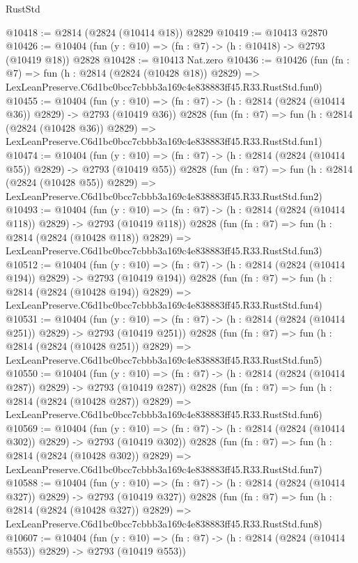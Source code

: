 \begin{lexlean}{RustStd}
\begin{coremodule}
@10418 := @2814 (@2824 (@10414 @18)) @2829
@10419 := @10413 @2870
@10426 := @10404 (fun (y : @10) => (fn : @7) -> (h : @10418) -> @2793 (@10419 @18)) @2828
@10428 := @10413 Nat.zero
@10436 := @10426
    (fun (fn : @7) =>
    fun (h : @2814 (@2824 (@10428 @18)) @2829) =>
    LexLeanPreserve.C6d1bc0bcc7cbbb3a169c4e838883ff45.R33.RustStd.fun0)
@10455 := @10404
    (fun (y : @10) => (fn : @7) -> (h : @2814 (@2824 (@10414 @36)) @2829) -> @2793 (@10419 @36))
    @2828
    (fun (fn : @7) =>
    fun (h : @2814 (@2824 (@10428 @36)) @2829) =>
    LexLeanPreserve.C6d1bc0bcc7cbbb3a169c4e838883ff45.R33.RustStd.fun1)
@10474 := @10404
    (fun (y : @10) => (fn : @7) -> (h : @2814 (@2824 (@10414 @55)) @2829) -> @2793 (@10419 @55))
    @2828
    (fun (fn : @7) =>
    fun (h : @2814 (@2824 (@10428 @55)) @2829) =>
    LexLeanPreserve.C6d1bc0bcc7cbbb3a169c4e838883ff45.R33.RustStd.fun2)
@10493 := @10404
    (fun (y : @10) => (fn : @7) -> (h : @2814 (@2824 (@10414 @118)) @2829) -> @2793 (@10419 @118))
    @2828
    (fun (fn : @7) =>
    fun (h : @2814 (@2824 (@10428 @118)) @2829) =>
    LexLeanPreserve.C6d1bc0bcc7cbbb3a169c4e838883ff45.R33.RustStd.fun3)
@10512 := @10404
    (fun (y : @10) => (fn : @7) -> (h : @2814 (@2824 (@10414 @194)) @2829) -> @2793 (@10419 @194))
    @2828
    (fun (fn : @7) =>
    fun (h : @2814 (@2824 (@10428 @194)) @2829) =>
    LexLeanPreserve.C6d1bc0bcc7cbbb3a169c4e838883ff45.R33.RustStd.fun4)
@10531 := @10404
    (fun (y : @10) => (fn : @7) -> (h : @2814 (@2824 (@10414 @251)) @2829) -> @2793 (@10419 @251))
    @2828
    (fun (fn : @7) =>
    fun (h : @2814 (@2824 (@10428 @251)) @2829) =>
    LexLeanPreserve.C6d1bc0bcc7cbbb3a169c4e838883ff45.R33.RustStd.fun5)
@10550 := @10404
    (fun (y : @10) => (fn : @7) -> (h : @2814 (@2824 (@10414 @287)) @2829) -> @2793 (@10419 @287))
    @2828
    (fun (fn : @7) =>
    fun (h : @2814 (@2824 (@10428 @287)) @2829) =>
    LexLeanPreserve.C6d1bc0bcc7cbbb3a169c4e838883ff45.R33.RustStd.fun6)
@10569 := @10404
    (fun (y : @10) => (fn : @7) -> (h : @2814 (@2824 (@10414 @302)) @2829) -> @2793 (@10419 @302))
    @2828
    (fun (fn : @7) =>
    fun (h : @2814 (@2824 (@10428 @302)) @2829) =>
    LexLeanPreserve.C6d1bc0bcc7cbbb3a169c4e838883ff45.R33.RustStd.fun7)
@10588 := @10404
    (fun (y : @10) => (fn : @7) -> (h : @2814 (@2824 (@10414 @327)) @2829) -> @2793 (@10419 @327))
    @2828
    (fun (fn : @7) =>
    fun (h : @2814 (@2824 (@10428 @327)) @2829) =>
    LexLeanPreserve.C6d1bc0bcc7cbbb3a169c4e838883ff45.R33.RustStd.fun8)
@10607 := @10404
    (fun (y : @10) => (fn : @7) -> (h : @2814 (@2824 (@10414 @553)) @2829) -> @2793 (@10419 @553))

\end{coremodule}
\end{lexlean}
